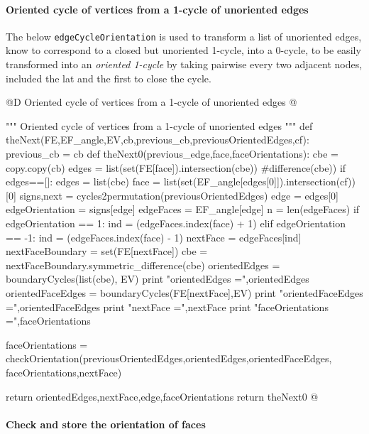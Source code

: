 \documentclass[11pt,oneside]{article}    %
\begin{document}
\paragraph{Oriented cycle of vertices from a 1-cycle of unoriented edges}
The below \texttt{edgeCycleOrientation} is used to transform a list of unoriented edges, know to correspond to a closed but unoriented 1-cycle, into a 0-cycle, to be easily transformed into an \emph{oriented 1-cycle} by taking pairwise every two adjacent nodes, included the lat and the first to close the cycle.

@D Oriented cycle of vertices from a 1-cycle of unoriented edges
@{""" Oriented cycle of vertices from a 1-cycle of unoriented edges """
def theNext(FE,EF_angle,EV,cb,previous_cb,previousOrientedEdges,cf):
    previous_cb = cb
    def theNext0(previous_edge,face,faceOrientations):
        cbe = copy.copy(cb)
        edges = list(set(FE[face]).intersection(cbe)) #difference(cbe))
        if edges==[]: 
            edges = list(cbe)
            face = list(set(EF_angle[edges[0]]).intersection(cf))[0]
        signs,next = cycles2permutation(previousOrientedEdges)
        edge = edges[0]
        edgeOrientation = signs[edge]
        edgeFaces = EF_angle[edge]
        n = len(edgeFaces)
        if edgeOrientation == 1: 
            ind = (edgeFaces.index(face) + 1)%
        elif edgeOrientation == -1:
            ind = (edgeFaces.index(face) - 1)%
        nextFace = edgeFaces[ind]
        nextFaceBoundary = set(FE[nextFace])
        cbe = nextFaceBoundary.symmetric_difference(cbe)
        orientedEdges = boundaryCycles(list(cbe), EV)
        print "orientedEdges =",orientedEdges
        orientedFaceEdges = boundaryCycles(FE[nextFace],EV)
        print "orientedFaceEdges =",orientedFaceEdges
        print "nextFace =",nextFace
        print "faceOrientations =",faceOrientations
        
        faceOrientations = checkOrientation(previousOrientedEdges,orientedEdges,orientedFaceEdges, faceOrientations,nextFace)

        return orientedEdges,nextFace,edge,faceOrientations
    return theNext0
@}


\paragraph{Check and store the orientation of faces}
\end{document}
